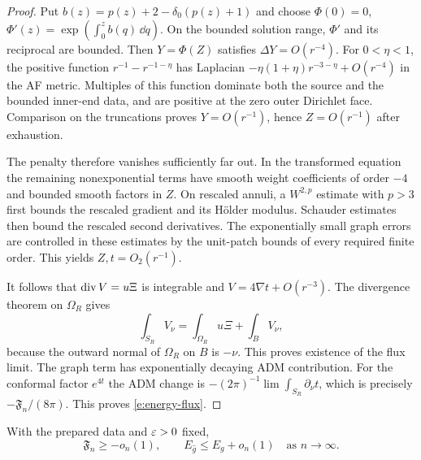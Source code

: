 \begin{proof}
Put $b(z)=p(z)+2-\delta_0(p(z)+1)$ and choose $\Phi(0)=0$,
$\Phi'(z)=\exp(\int_0^z b(q)\,\dd q)$.  On the bounded solution
range, $\Phi'$ and its reciprocal are bounded.  Then
$Y=\Phi(Z)$ satisfies $\Delta Y=O(r^{-4})$.  For
$0<\eta<1$, the positive function
$r^{-1}-r^{-1-\eta}$ has Laplacian
$-\eta(1+\eta)r^{-3-\eta}+O(r^{-4})$ in the AF metric.
Multiples of this function dominate both the source and the bounded
inner-end data, and are positive at the zero outer Dirichlet face.
Comparison on the truncations proves $Y=O(r^{-1})$, hence
$Z=O(r^{-1})$ after exhaustion.

The penalty therefore vanishes sufficiently far out.  In the
transformed equation the remaining nonexponential terms have smooth
weight coefficients of order $-4$ and bounded smooth factors
in $Z$.  On rescaled annuli, a $W^{2,p}$ estimate with $p>3$ first
bounds the rescaled gradient and its H\"older modulus.  Schauder
estimates then bound the rescaled second derivatives.  The
exponentially small graph errors are controlled in these estimates
by the unit-patch bounds of every required finite order.  This yields
$Z,t=O_2(r^{-1})$.

It follows that $\operatorname{div} V=u\Xi$ is integrable and
$V=4\nabla t+O(r^{-3})$.  The divergence theorem on $\Omega_R$
gives
\[
 \int_{S_R}V_\nu=\int_{\Omega_R}u\Xi+\int_BV_\nu,
\]
because the outward normal of $\Omega_R$ on $B$ is $-\nu$.
This proves existence of the flux limit.  The graph term has
exponentially decaying ADM contribution.  For the conformal factor
$e^{4t}$ the ADM change is
$-(2\pi)^{-1}\lim\int_{S_R}\partial_\nu t$, which is precisely
$-\mathfrak F_n/(8\pi)$.  This proves \eqref{e:energy-flux}.
\end{proof}

\begin{proposition}\label{e:flux}
With the prepared data and $\varepsilon>0$ fixed,
\[
 \mathfrak F_n\ge-o_n(1),\qquad
 E_{\hat g}\le E_g+o_n(1)
                    \quad\text{as }n\to\infty.
\]
\end{proposition}

